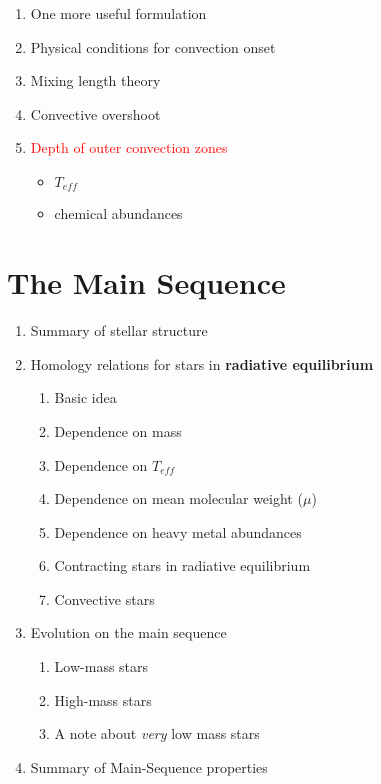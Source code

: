 \documentclass{article}
\begin{document}
\begin{enumerate}
\begin{enumerate}
            \item One more useful formulation
            \item Physical conditions for convection onset
            \item Mixing length theory
            \item Convective overshoot
            \item \textcolor{red}{Depth of outer convection zones}
                \begin{itemize}
                  \item $T_{eff}$
                  \item chemical abundances
                \end{itemize}
        \end{enumerate}
\end{enumerate}
\section{The Main Sequence}
\begin{enumerate}
    \item Summary of stellar structure
    \item Homology relations for stars in \textbf{radiative equilibrium}
        \begin{enumerate}
            \item Basic idea
            \item Dependence on mass
            \item Dependence on ${T_{eff}}$
            \item Dependence on mean molecular weight (${\mu}$)
            \item Dependence on heavy metal abundances
            \item Contracting stars in radiative equilibrium
            \item Convective stars
        \end{enumerate}
    \item Evolution on the main sequence
        \begin{enumerate}
            \item Low-mass stars
            \item High-mass stars
            \item A note about \emph{very} low mass stars
        \end{enumerate}
    \item Summary of Main-Sequence properties
\end{enumerate}
\newpage
\end{document}
